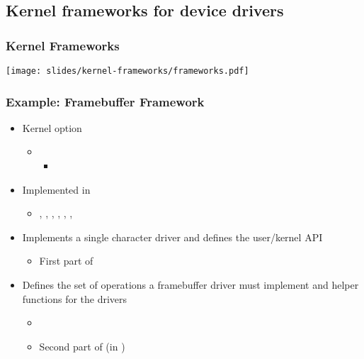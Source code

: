 \subsection{Kernel frameworks for device drivers}

\begin{frame}
  \frametitle{Kernel Frameworks}
  \begin{center}
    \texttt{[image: slides/kernel-frameworks/frameworks.pdf]}
  \end{center}
\end{frame}

\begin{frame}
  \frametitle{Example: Framebuffer Framework}
  \begin{itemize}
  \item Kernel option 
    \begin{itemize}
    \item {}
      \begin{itemize}
      \item {}
      \end{itemize}
    \end{itemize}
  \item Implemented in 
    \begin{itemize}
    \item {}, , ,
      , , ,
    \end{itemize}
  \item Implements a single character driver and defines the
    user/kernel API
    \begin{itemize}
    \item First part of 
    \end{itemize}
  \item Defines the set of operations a framebuffer driver must
    implement and helper functions for the drivers
    \begin{itemize}
    \item {}
    \item Second part of  (in
      )
    \end{itemize}
  \end{itemize}
\end{frame}

